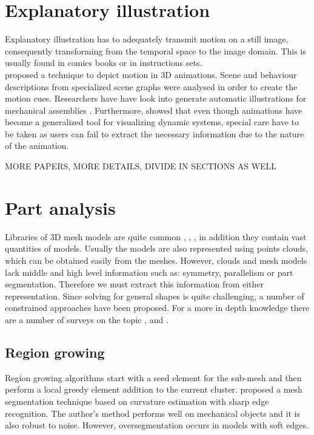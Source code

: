 \section{Explanatory illustration}

Explanatory illustration has to adequately transmit motion on a still image, consequently transforming from the temporal space to the image domain.
This is usually found in comics books or in instructions sets.\\

\cite{Nienhaus2005} proposed a technique to depict motion in 3D animations.
Scene and behaviour descriptions from specialized scene graphs were analysed in order to create the motion cues.  
Researchers have have look into generate automatic illustrations for mechanical assemblies \cite{Mitra2010}.
Furthermore, \cite{Lowe2014} showed that even though animations have become a generalized tool for visualizing dynamic systems, special care have to be taken as users can fail to extract the necessary information due to the nature of the animation.

MORE PAPERS, MORE DETAILS, DIVIDE IN SECTIONS AS WELL

\section{Part analysis}

Libraries of 3D mesh models are quite common \cite{Trimble2014}, \cite{GrabCAD2014}, \cite{Autodesk2014}, in addition they contain vast quantities of models.   
Usually the models are also represented using points clouds, which can be obtained easily from the meshes.
However, clouds and mesh models lack middle and high level information such as: symmetry, parallelism or part segmentation.
Therefore we must extract this information from either representation.
Since solving for general shapes is quite challenging, a number of constrained approaches have been proposed.
For a more in depth knowledge there are a number of surveys on the topic \cite{Varady1997}, \cite{Agathos2007} and \cite{Shamir2008}.\\

\subsection{Region growing}

Region growing algorithms start with a seed element for the sub-mesh and then perform a local greedy element addition to the current cluster.
\cite{Mizoguchi2006} proposed a mesh segmentation technique based on curvature estimation with sharp edge recognition.
The author's method performs well on mechanical objects and it is also robust to noise.
However, oversegmentation occurs in models with soft edges.

